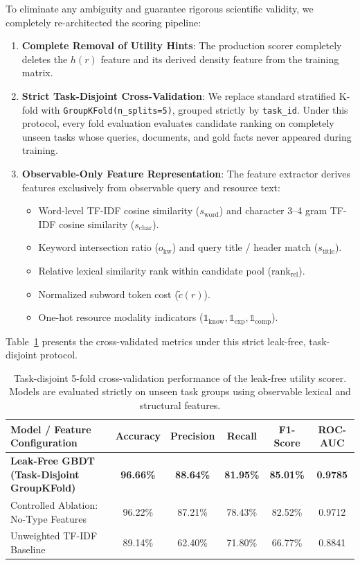 \documentclass{article}
\begin{document}
To eliminate any ambiguity and guarantee rigorous scientific validity, we completely re-architected the scoring pipeline:
\begin{enumerate}
    \item \textbf{Complete Removal of Utility Hints}: The production scorer completely deletes the $h(r)$ feature and its derived density feature from the training matrix.
    \item \textbf{Strict Task-Disjoint Cross-Validation}: We replace standard stratified K-fold with \texttt{GroupKFold(n\_splits=5)}, grouped strictly by \texttt{task\_id}. Under this protocol, every fold evaluation evaluates candidate ranking on completely unseen tasks whose queries, documents, and gold facts never appeared during training.
    \item \textbf{Observable-Only Feature Representation}: The feature extractor derives features exclusively from observable query and resource text:
    \begin{itemize}
        \item Word-level TF-IDF cosine similarity ($s_{\text{word}}$) and character 3--4 gram TF-IDF cosine similarity ($s_{\text{char}}$).
        \item Keyword intersection ratio ($o_{\text{kw}}$) and query title / header match ($s_{\text{title}}$).
        \item Relative lexical similarity rank within candidate pool ($\text{rank}_{\text{rel}}$).
        \item Normalized subword token cost ($\tilde{c}(r)$).
        \item One-hot resource modality indicators ($\mathbb{1}_{\text{know}}, \mathbb{1}_{\text{exp}}, \mathbb{1}_{\text{comp}}$).
    \end{itemize}
\end{enumerate}

Table~\ref{tab:leak_free_cv_appendix} presents the cross-validated metrics under this strict leak-free, task-disjoint protocol.

\begin{table}[h]
\centering
\small
\begin{tabular}{lccccc}
\toprule
\textbf{Model / Feature Configuration} & \textbf{Accuracy} & \textbf{Precision} & \textbf{Recall} & \textbf{F1-Score} & \textbf{ROC-AUC} \\
\midrule
\textbf{Leak-Free GBDT (Task-Disjoint GroupKFold)} & \textbf{96.66\%} & \textbf{88.64\%} & \textbf{81.95\%} & \textbf{85.01\%} & \textbf{0.9785} \\
Controlled Ablation: No-Type Features & 96.22\% & 87.21\% & 78.43\% & 82.52\% & 0.9712 \\
Unweighted TF-IDF Baseline & 89.14\% & 62.40\% & 71.80\% & 66.77\% & 0.8841 \\
\bottomrule
\end{tabular}
\caption{Task-disjoint 5-fold cross-validation performance of the leak-free utility scorer. Models are evaluated strictly on unseen task groups using observable lexical and structural features.}
\label{tab:leak_free_cv_appendix}
\end{table}
\end{document}
